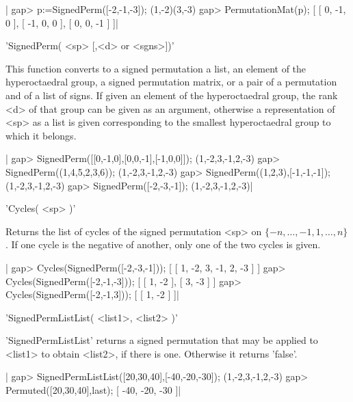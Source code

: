 |    gap> p:=SignedPerm([-2,-1,-3]);
    (1,-2)(3,-3)
    gap> PermutationMat(p);
    [ [ 0, -1, 0 ], [ -1, 0, 0 ], [ 0, 0, -1 ] ]|

%
%

'SignedPerm( <sp> [,<d> or <sgns>])'

This  function converts to a  signed permutation a list,  an element of the
hyperoctaedral  group,  a  signed  permutation  matrix,  or  a  pair  of  a
permutation   and  of  a  list  of  signs.  If  given  an  element  of  the
hyperoctaedral  group,  the  rank  <d>  of  that  group  can be given as an
argument,   otherwise  a  representation  of  <sp>   as  a  list  is  given
corresponding to the smallest hyperoctaedral group to which it belongs.

|    gap> SignedPerm([[0,-1,0],[0,0,-1],[-1,0,0]]);
    (1,-2,3,-1,2,-3)
    gap> SignedPerm((1,4,5,2,3,6)); 
    (1,-2,3,-1,2,-3)
    gap> SignedPerm((1,2,3),[-1,-1,-1]);
    (1,-2,3,-1,2,-3)
    gap> SignedPerm([-2,-3,-1]);
    (1,-2,3,-1,2,-3)|

%
%

'Cycles( <sp> )'

Returns   the  list   of  cycles   of  the   signed  permutation   <sp>  on
$\{-n,\ldots,-1,1,\ldots,n\}$.  If one  cycle is  the negative  of another,
only one of the two cycles is given.

|    gap> Cycles(SignedPerm([-2,-3,-1]));
    [ [ 1, -2, 3, -1, 2, -3 ] ]
    gap> Cycles(SignedPerm([-2,-1,-3]));
    [ [ 1, -2 ], [ 3, -3 ] ]
    gap> Cycles(SignedPerm([-2,-1,3]));
    [ [ 1, -2 ] ]|

%
%

    'SignedPermListList( <list1>, <list2> )'

'SignedPermListList'  returns a signed  permutation that may  be applied to
<list1> to obtain <list2>, if there is one. Otherwise it returns 'false'.

|    gap> SignedPermListList([20,30,40],[-40,-20,-30]);
    (1,-2,3,-1,2,-3)
    gap> Permuted([20,30,40],last);
    [ -40, -20, -30 ]|

%
%

